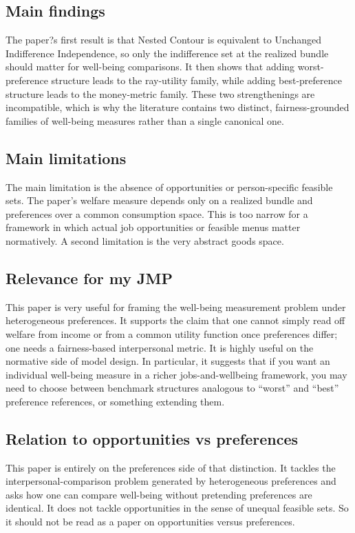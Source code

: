 \documentclass[11pt,a4paper]{article}
\begin{document}
\subsection*{Main findings}
The paper?s first result is that Nested Contour is equivalent to Unchanged Indifference Independence, so only the indifference set at the realized bundle should matter for well-being comparisons. It then shows that adding worst-preference structure leads to the ray-utility family, while adding best-preference structure leads to the money-metric family. These two strengthenings are incompatible, which is why the literature contains two distinct, fairness-grounded families of well-being measures rather than a single canonical one.

\subsection*{Main limitations}
The main limitation is the absence of opportunities or person-specific feasible sets. The paper’s welfare measure depends only on a realized bundle and preferences over a common consumption space. This is too narrow for a framework in which actual job opportunities or feasible menus matter normatively. A second limitation is the very abstract goods space.

\subsection*{Relevance for my JMP}
This paper is very useful for framing the well-being measurement problem under heterogeneous preferences. It supports the claim that one cannot simply read off welfare from income or from a common utility function once preferences differ; one needs a fairness-based interpersonal metric. It is highly useful on the normative side of model design. In particular, it suggests that if you want an individual well-being measure in a richer jobs-and-wellbeing framework, you may need to choose between benchmark structures analogous to “worst” and “best” preference references, or something extending them.

\subsection*{Relation to opportunities vs preferences}
This paper is entirely on the preferences side of that distinction. It tackles the interpersonal-comparison problem generated by heterogeneous preferences and asks how one can compare well-being without pretending preferences are identical. It does not tackle opportunities in the sense of unequal feasible sets. So it should not be read as a paper on opportunities versus preferences.
\end{document}

